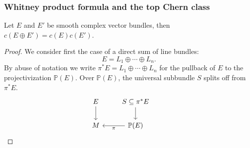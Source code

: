 \subsubsection{Whitney product formula and the top Chern class}
\begin{proposition}
Let $E$ and $E'$ be smooth complex vector bundles, then $c(E\oplus E')=c(E)c(E')$.
\end{proposition}
\begin{proof}
We consider first the case of a direct sum of line bundles:
\[E=L_1\oplus\cdots\oplus L_n.\]
By abuse of notation we write $\pi^*E=L_1\oplus\cdots\oplus L_n$ for the pullback of $E$ to the projectivization $\mathbb{P}(E)$. Over $\mathbb{P}(E)$, the universal 
subbundle $S$ splits off from $\pi^*E$.
\[\begin{tikzcd}
E\ar[d]&S\sub\pi^*E\ar[d]&\\
M&\mathbb{P}(E)\ar[l,"\pi"]
\end{tikzcd}\]


\end{proof}
